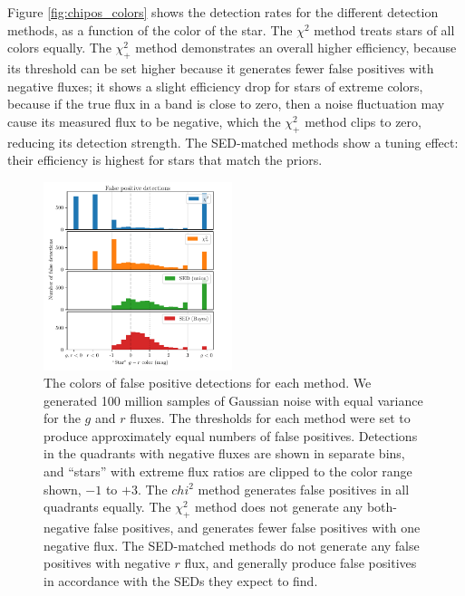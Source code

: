 \documentclass[11pt,letterpaper,linenumbers]{aastex63}
\newcommand{\chipos}{\chi_+}
\begin{document}
Figure \ref{fig:chipos_colors} shows the detection rates for the
different detection methods, as a function of the color of the star.
The $\chi^2$ method treats stars of all colors equally.  The
$\chipos^2$ method demonstrates an overall higher efficiency, because
its threshold can be set higher because it generates fewer false
positives with negative fluxes; it shows a slight efficiency drop for
stars of extreme colors, because if the true flux in a band is close
to zero, then a noise fluctuation may cause its measured flux to be
negative, which the $\chipos^2$ method clips to zero, reducing its
detection strength.  The SED-matched methods show a tuning effect:
their efficiency is highest for stars that match the priors.

\begin{figure}
  \begin{center}
    \includegraphics[width=0.49\textwidth]{chisq-false-det}%
  \end{center}
  \caption{The colors of false positive detections for each method.
    We generated 100 million samples of Gaussian noise with equal
    variance for the $g$ and $r$ fluxes.  The thresholds for each
    method were set to produce approximately equal numbers of false
    positives.  Detections in the quadrants with negative fluxes are
    shown in separate bins, and ``stars'' with extreme flux ratios are
    clipped to the color range shown, $-1$ to $+3$.  The $chi^2$
    method generates false positives in all quadrants equally.  The
    $\chipos^2$ method does not generate any both-negative false
    positives, and generates fewer false positives with one negative
    flux.  The SED-matched methods do not generate any false positives
    with negative $r$ flux, and generally produce false positives in
    accordance with the SEDs they expect to find.
  \label{fig:chipos_false}}
\end{figure}
\end{document}
